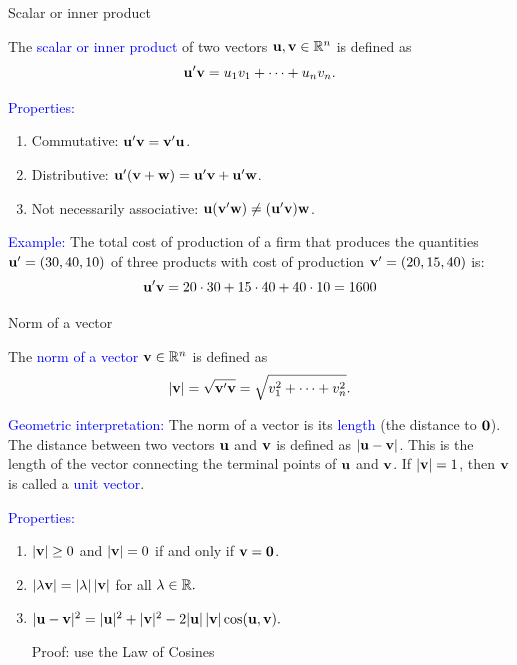 \documentclass[11pt,aspectratio=169]{beamer}
\begin{document}
\begin{frame}{Scalar or inner product}

The \textcolor{blue}{scalar or inner product} of two vectors ${\bf u}, {\bf v}\in \mathbb R^n$ is defined as
$$
{\bf u}' {\bf v}=u_1 v_1+\cdots +u_nv_n.
$$

\textcolor{blue}{Properties:}
\begin{enumerate}
\item Commutative: ${\bf u}' {\bf v}= {\bf v}' {\bf u}$.
\item Distributive: ${\bf u}' ({\bf v}+{\bf  w})={\bf u}' {\bf v}+{\bf u}' {\bf w}$.
\item Not necessarily associative: $\bf{u} ({\bf v}' {\bf w}) \neq ({\bf u}' {\bf v}) {\bf w}$.
\end{enumerate}
\vskip 12pt
\textcolor{blue}{Example:} The total cost of production of a firm that produces the quantities ${\bf u}'=(30,40,10)$ of three products with cost of production ${\bf v}'=(20,15, 40)$ is:
$$
{\bf u}' {\bf v}=20 \cdot 30+15 \cdot 40+ 40 \cdot 10=1600
$$
\end{frame}\begin{frame}{Norm of a vector}

The \textcolor{blue}{norm of a vector} ${\bf v} \in \mathbb R^n$ is defined as
$$
\vert {\bf v}\vert=\sqrt{ {\bf v}' {\bf v}}=\sqrt{v_1^2+\dots+v^2_n}.
$$


\textcolor{blue}{Geometric interpretation:} The norm of a vector is its \textcolor{blue}{length} (the distance to ${\bf 0}$). The distance between two vectors 
${\bf u}$ and ${\bf v}$ is defined as $\vert {\bf u}-{\bf v}\vert$. This is the length of the vector connecting the terminal points of ${\bf u}$ and ${\bf v}$.
If  $\vert {\bf v} \vert=1$, then ${\bf v}$ is called a \textcolor{blue}{unit vector}.

\textcolor{blue}{Properties:}
\begin{enumerate}
\item $\vert {\bf v} \vert\geq 0$ and $\vert {\bf v} \vert =0$ if and only if ${\bf v}=\bf{0}$.
\item $\vert \lambda {\bf v} \vert = \vert \lambda \vert \, \vert {\bf v} \vert $ for all $\lambda \in \mathbb R.$


\item $
\vert {\bf u}- {\bf v}\vert^2=\vert {\bf u} \vert^2 +\vert {\bf v}\vert^2-2 \vert {\bf u} \vert \, \vert {\bf v}\vert \cos ({\bf u}, {\bf v}).
$ \begin{tiny}Proof: use the  Law of Cosines \end{tiny}



\end{enumerate}
\end{frame}
\end{document}
